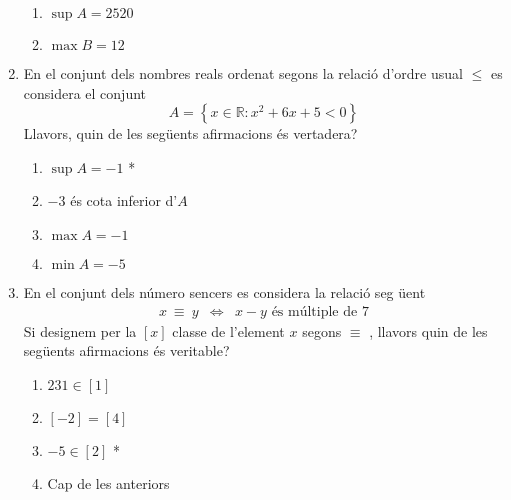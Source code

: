 \begin{enumerate}
\begin{enumerate}
\item $\sup A=2520$

\item $\max B=12$
\end{enumerate}

\item En el conjunt dels nombres reals ordenat segons la relaci\'{o} d'ordre
usual $\leq$ es considera el conjunt%
\begin{equation*}
A=\left\{ x\in\mathbb{R}:x^{2}+6x+5<0\right\}
\end{equation*}
Llavors, quin de les seg\"{u}ents afirmacions \'{e}s vertadera?

\begin{enumerate}
\item $\sup A=-1$ *

\item $-3$ \'{e}s cota inferior d'$A$

\item $\max A=-1$

\item $\min A=-5$
\end{enumerate}

\item En el conjunt dels n\'{u}mero sencers es considera la relaci\'{o} seg%
\"{u}ent%
\begin{equation*}
\begin{array}{ccc}
x~\equiv~y & \Longleftrightarrow & x-y\text{ \'{e}s m\'{u}ltiple de }7%
\end{array}%
\end{equation*}
Si designem per la $\left[ x\right] $ classe de l'element $x$ segons $\equiv$%
, llavors quin de les seg\"{u}ents afirmacions \'{e}s veritable?

\begin{enumerate}
\item $231\in\left[ 1\right] $

\item $\left[ -2\right] =\left[ 4\right] $

\item $-5\in \left[ 2\right] $ *

\item Cap de les anteriors
\end{enumerate}
\end{enumerate}


